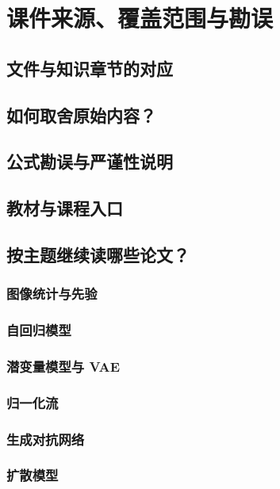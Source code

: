 \chapter{课件来源、覆盖范围与勘误}
\label{chap:sources}

\section{文件与知识章节的对应}
\label{sec:sources-mapping}
\contentplaceholder

\section{如何取舍原始内容？}
\label{sec:sources-selection}
\contentplaceholder

\section{公式勘误与严谨性说明}
\label{sec:sources-corrections}
\contentplaceholder

\section{教材与课程入口}
\label{sec:sources-textbooks}
\contentplaceholder

\section{按主题继续读哪些论文？}
\label{sec:sources-papers}
\contentplaceholder

\subsection{图像统计与先验}
\label{subsec:sources-image-priors}
\contentplaceholder

\subsection{自回归模型}
\label{subsec:sources-autoregressive}
\contentplaceholder

\subsection{潜变量模型与 VAE}
\label{subsec:sources-vae}
\contentplaceholder

\subsection{归一化流}
\label{subsec:sources-flow}
\contentplaceholder

\subsection{生成对抗网络}
\label{subsec:sources-gan}
\contentplaceholder

\subsection{扩散模型}
\label{subsec:sources-diffusion}
\contentplaceholder
